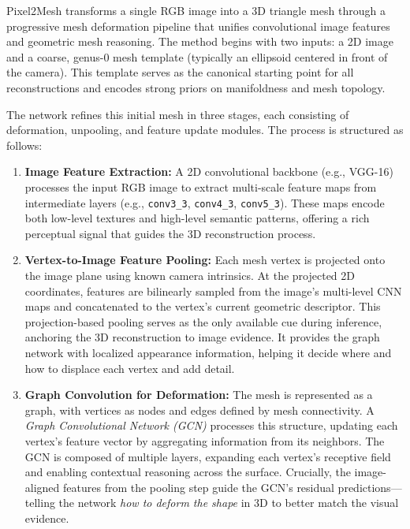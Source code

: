 Pixel2Mesh transforms a single RGB image into a 3D triangle mesh through a progressive mesh deformation pipeline that unifies convolutional image features and geometric mesh reasoning. The method begins with two inputs: a 2D image and a coarse, genus-0 mesh template (typically an ellipsoid centered in front of the camera). This template serves as the canonical starting point for all reconstructions and encodes strong priors on manifoldness and mesh topology.

The network refines this initial mesh in three stages, each consisting of deformation, unpooling, and feature update modules. The process is structured as follows:

\begin{enumerate}
    \item \textbf{Image Feature Extraction:} A 2D convolutional backbone (e.g., VGG-16) processes the input RGB image to extract multi-scale feature maps from intermediate layers (e.g., \texttt{conv3\_3}, \texttt{conv4\_3}, \texttt{conv5\_3}). These maps encode both low-level textures and high-level semantic patterns, offering a rich perceptual signal that guides the 3D reconstruction process.
    
    \item \textbf{Vertex-to-Image Feature Pooling:} Each mesh vertex is projected onto the image plane using known camera intrinsics. At the projected 2D coordinates, features are bilinearly sampled from the image's multi-level CNN maps and concatenated to the vertex's current geometric descriptor. This projection-based pooling serves as the only available cue during inference, anchoring the 3D reconstruction to image evidence. It provides the graph network with localized appearance information, helping it decide where and how to displace each vertex and add detail.
    
    \item \textbf{Graph Convolution for Deformation:} The mesh is represented as a graph, with vertices as nodes and edges defined by mesh connectivity. A \emph{Graph Convolutional Network (GCN)} processes this structure, updating each vertex’s feature vector by aggregating information from its neighbors. The GCN is composed of multiple layers, expanding each vertex’s receptive field and enabling contextual reasoning across the surface. Crucially, the image-aligned features from the pooling step guide the GCN’s residual predictions—telling the network \emph{how to deform the shape} in 3D to better match the visual evidence.
    

\end{enumerate}
